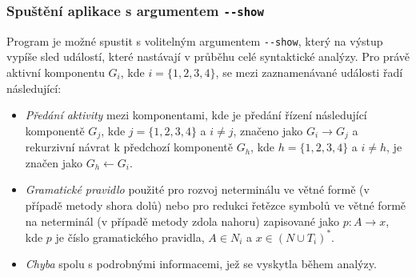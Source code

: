 \subsubsection*{Spuštění aplikace s argumentem \texttt{-\--show}}
Program je možné spustit s volitelným argumentem \texttt{-\--show}, který na výstup vypíše sled událostí, které nastávají v průběhu celé syntaktické analýzy. Pro právě aktivní
komponentu $G_i$, kde $i = \{1, 2, 3, 4\}$, se mezi zaznamenávané události řadí následující:
\begin{itemize}
  \item \emph{Předání aktivity} mezi komponentami, kde je předání řízení následující komponentě $G_j$, kde $j = \{1, 2, 3, 4\}$ a $i \neq j$, značeno jako $G_i \rightarrow G_j$ a
        rekurzivní návrat k předchozí komponentě $G_h$, kde $h = \{1, 2, 3, 4\}$ a $i \neq h$, je značen jako $G_h \leftarrow G_i$.
  \item \emph{Gramatické pravidlo} použité pro rozvoj neterminálu ve větné formě (v případě metody shora dolů) nebo pro redukci řetězce symbolů ve větné formě na neterminál
        (v případě metody zdola nahoru) zapisované jako $p: A \rightarrow x$, kde $p$ je číslo gramatického pravidla, $A \in N_i$ a $x \in (N \cup T_i)^*$.
  \item \emph{Chyba} spolu s podrobnými informacemi, jež se vyskytla během analýzy.
\end{itemize}

